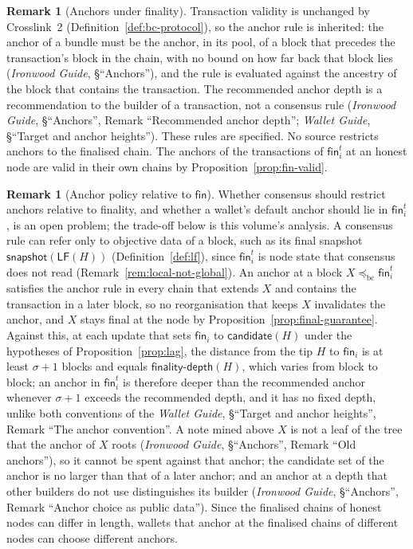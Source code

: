 \documentclass[11pt,a4paper]{article}
\theoremstyle{definition}
\newtheorem{remark}[theorem]{Remark}
\newcommand{\bc}{\mathrm{bc}}
\newcommand{\preceqbc}{\preceq_{\bc}}
\newcommand{\snapshot}{\mathsf{snapshot}}
\newcommand{\LF}{\mathsf{LF}}
\newcommand{\candidate}{\mathsf{candidate}}
\newcommand{\finalitydepth}{\mathsf{finality\text{-}depth}}
\newcommand{\fin}{\mathsf{fin}}
\begin{document}
\begin{remark}[Anchors under finality]\label{rem:anchors}
Transaction validity is unchanged by Crosslink~2
(Definition~\ref{def:bc-protocol}), so the anchor rule is inherited: the
anchor of a bundle must be the anchor, in its pool, of a block that precedes
the transaction's block in the chain, with no bound on how far back that
block lies (\emph{Ironwood Guide}, \S``Anchors''), and the rule is evaluated
against the ancestry of the block that contains the transaction. The recommended
anchor depth is a recommendation to the builder of a transaction, not a
consensus rule (\emph{Ironwood Guide}, \S``Anchors'', Remark ``Recommended
anchor depth''; \emph{Wallet Guide}, \S``Target and anchor heights''). These
rules are specified. No source restricts anchors to the finalised chain. The
anchors of the transactions of $\fin_i^t$ at an honest node are valid in their
own chains by Proposition~\ref{prop:fin-valid}.
\end{remark}

\begin{remark}[Anchor policy relative to $\fin$]\label{rem:anchor-fin}
Whether consensus should restrict anchors relative to finality, and whether a
wallet's default anchor should lie in $\fin_i^t$, is an open problem; the
trade-off below is this volume's analysis. A consensus rule can refer only to
objective data of a block, such as its final snapshot $\snapshot(\LF(H))$
(Definition~\ref{def:lf}), since $\fin_i^t$ is node state that consensus does
not read (Remark~\ref{rem:local-not-global}). An anchor at a block $X
\preceqbc \fin_i^t$ satisfies the anchor rule in every chain that extends $X$
and contains the transaction in a later block, so no reorganisation that
keeps $X$ invalidates the anchor, and $X$ stays final at the node by
Proposition~\ref{prop:final-guarantee}. Against this, at each update that
sets $\fin_i$ to $\candidate(H)$ under the hypotheses of
Proposition~\ref{prop:lag}, the distance from the tip $H$
to $\fin_i$ is at least $\sigma + 1$ blocks and equals $\finalitydepth(H)$,
which varies from block to block; an anchor in $\fin_i^t$ is therefore
deeper than the recommended anchor whenever $\sigma + 1$ exceeds the
recommended depth, and it has no fixed depth, unlike both conventions of the
\emph{Wallet Guide}, \S``Target and anchor heights'', Remark ``The anchor
convention''. A note mined above $X$ is not a leaf of the tree that the
anchor of $X$ roots (\emph{Ironwood Guide}, \S``Anchors'', Remark ``Old
anchors''), so it cannot be spent against that anchor; the candidate set of
the anchor is no larger than that of a later anchor; and an anchor at a depth
that other builders do not use distinguishes its builder (\emph{Ironwood
Guide}, \S``Anchors'', Remark ``Anchor choice as public data''). Since the
finalised chains of honest nodes can differ in length, wallets that anchor
at the finalised chains of different nodes can choose different anchors.
\end{remark}
\end{document}

